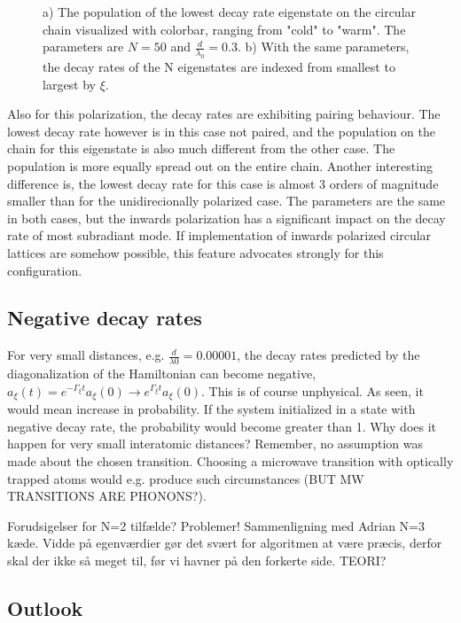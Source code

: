 \documentclass{article}
\begin{document}
\begin{figure}[H]
\begin{subfigure}[b]{0.49\textwidth}
        \caption{}
        \label{fig:circular_inwards_decayrates}
    \end{subfigure}
    \caption{a) The population of the lowest decay rate eigenstate on the circular chain visualized with colorbar, ranging from "cold" to "warm". The parameters are $N=50$ and $\frac{d}{\lambda_0}=0.3$. b) With the same parameters, the decay rates of the N eigenstates are indexed from smallest to largest by $\xi$. }
    \label{fig:circular_inwards}
\end{figure}

Also for this polarization, the decay rates are exhibiting pairing behaviour. The lowest decay rate however is in this case not paired, and the population on the chain for this eigenstate is also much different from the other case. The population is more equally spread out on the entire chain. Another interesting difference is, the lowest decay rate for this case is almost 3 orders of magnitude smaller than for the unidirecionally polarized case. The parameters are the same in both cases, but the inwards polarization has a significant impact on the decay rate of most subradiant mode. If implementation of inwards polarized circular lattices are somehow possible, this feature advocates strongly for this configuration. 

\subsection{Negative decay rates}\label{disc:negative}

For very small distances, e.g. $\frac{d}{\lambda0} = 0.00001$, the decay rates predicted by the diagonalization of the Hamiltonian can become negative, $a_\xi(t)=e^{-\Gamma_\xi t} a_\xi (0) \rightarrow e^{\Gamma_\xi t} a_\xi (0)$. This is of course unphysical. As seen, it would mean increase in probability. If the system initialized in a state with negative decay rate, the probability would become greater than 1. Why does it happen for very small interatomic distances? Remember, no assumption was made about the chosen transition. Choosing a microwave transition with optically trapped atoms would e.g. produce such circumstances (BUT MW TRANSITIONS ARE PHONONS?). 

Forudsigelser for N=2 tilfælde? Problemer! Sammenligning med Adrian N=3 kæde. Vidde på egenværdier gør det svært for algoritmen at være præcis, derfor skal der ikke så meget til, før vi havner på den forkerte side. TEORI?

\subsection{Outlook}\label{sec:outlook}
\end{document}
